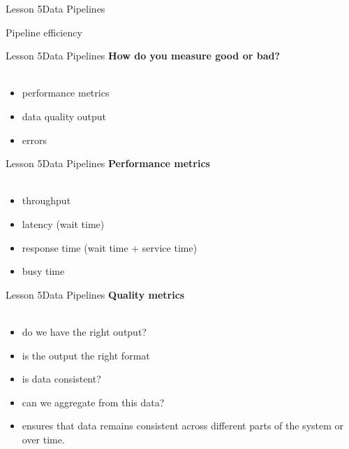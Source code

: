 \documentclass[aspectratio=1610]{beamer}
\begin{document}
\begin{frame}{Lesson 5}{Data Pipelines}
\Huge
\begin{center}
Pipeline efficiency
\end{center}
\end{frame}




\begin{frame}{Lesson 5}{Data Pipelines}
\LARGE
\textbf{How do you measure good or bad?}\\~\\
\begin{itemize}
    \item performance metrics
    \item data quality output
    \item errors
\end{itemize}
\end{frame}




\begin{frame}{Lesson 5}{Data Pipelines}
\LARGE
\textbf{Performance metrics}\\~\\
\begin{itemize}
    \item throughput
    \item latency (wait time)
    \item response time (wait time + service time)
    \item busy time
\end{itemize}
\end{frame}



\begin{frame}{Lesson 5}{Data Pipelines}
\LARGE
\textbf{Quality metrics}\\~\\
\begin{itemize}
    \item do we have the right output?
    \item is the output the right format
    \item is data consistent? 
    \item can we aggregate from this data?
    \item ensures that data remains consistent across different parts of the system or over time.
\end{itemize}
\end{frame}
\end{document}
